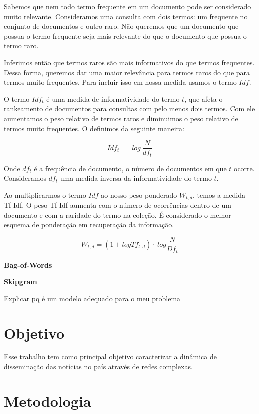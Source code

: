 \documentclass[a4paper,12pt]{article}
\begin{document}
\begin{description}
Sabemos que nem todo termo frequente em um documento pode ser considerado muito relevante. Consideramos uma consulta com dois termos:
um frequente no conjunto de documentos e outro raro. Não queremos que um documento que possua o termo frequente seja mais relevante do que o
documento que possua o termo raro.

Inferimos então que termos raros são mais informativos do que termos frequentes. Dessa forma, queremos dar uma maior relevância para
termos raros do que para termos muito frequentes. Para incluir isso em nossa medida usamos o termo $Idf$.

O termo $Idf_{t}$ é uma medida de informatividade do termo $t$, que afeta o rankeamento de documentos para consultas com pelo menos dois
termos. Com ele aumentamos o peso relativo de termos raros e diminuimos o peso relativo
de termos muito frequentes. O definimos da seguinte maneira:

$$ Idf_{t}\ = \ log\ \frac{N}{df_{t}}$$

Onde $df_{t}$ é a frequência de documento, o número de documentos em que $t$ ocorre. Consideramos $df_{t}$ uma medida inversa da informatividade
do termo $t$.

Ao multiplicarmos o termo $Idf$ ao nosso peso ponderado $W_{t,d}$, temos a medida Tf-Idf. O peso Tf-Idf aumenta com o número de ocorrências
dentro de um documento e com a raridade do termo na coleção. É considerado o melhor esquema de ponderação em recuperação da informação.

$$ W_{t,d} = (1 + log Tf_{t,d}) \cdot \ log \dfrac{N}{Df_{t}}$$

\item \textbf{Bag-of-Words}
\item \textbf{Skipgram}

Explicar pq é um modelo adequado para o meu problema
\end{description}

\section{Objetivo}

Esse trabalho tem como principal objetivo caracterizar a dinâmica de disseminação das notícias no país através de redes complexas.




\pagebreak
\section{Metodologia}
\end{document}
